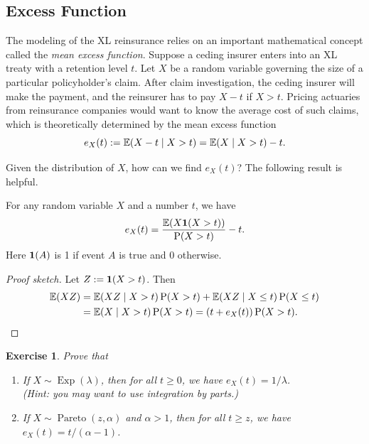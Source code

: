 \documentclass[12pt]{article}
\DeclareMathOperator{\Exp}{Exp}
\DeclareMathOperator{\Pareto}{Pareto}
\newtheorem{exercise}{Exercise}[section]
\begin{document}
\subsection{Excess Function}

The modeling of the XL reinsurance relies on an important mathematical concept
called the \emph{mean excess function}.
Suppose a ceding insurer enters into an XL treaty with a retention level $t$.
Let $X$ be a random variable governing the size of a particular policyholder's claim.
After claim investigation, the ceding insurer will make the payment,
and the reinsurer has to pay $X-t$ if $X > t$.
Pricing actuaries from reinsurance companies would want to know the average cost of such claims,
which is theoretically determined by the mean excess function
\begin{equation}
\label{eq:excess-defn}
e_X(t) := \operatorname*{\mathbb{E}}(X-t \mid X>t) = \operatorname*{\mathbb{E}}(X \mid X>t) - t.
\end{equation}

Given the distribution of $X$, how can we find $e_X(t)$?
The following result is helpful.

\begin{tcolorbox}[myres]
\begin{theorem}
\label{thm:excess-alt}
For any random variable $X$ and a number $t$, we have
\[ e_X(t) = \frac{\operatorname*{\mathbb{E}}(X\mathbf{1}(X > t))}{\operatorname{\mathrm{P}}(X > t)} - t. \]
Here $\mathbf{1}(A)$ is 1 if event $A$ is true and 0 otherwise.
\end{theorem}
\end{tcolorbox}
\begin{proof}[Proof sketch]
Let $Z := \mathbf{1}(X > t)$. Then
\begin{align*}
\operatorname*{\mathbb{E}}(XZ) &= \operatorname*{\mathbb{E}}(XZ \mid X > t)\operatorname{\mathrm{P}}(X > t) + \operatorname*{\mathbb{E}}(XZ \mid X \le t)\operatorname{\mathrm{P}}(X \le t)
\\ &= \operatorname*{\mathbb{E}}(X \mid X > t)\operatorname{\mathrm{P}}(X > t) = (t + e_X(t))\operatorname{\mathrm{P}}(X > t).
\qedhere \end{align*}
\end{proof}

\begin{tcolorbox}[mathExe]
\begin{exercise}
\label{exe:excess}
Prove that
\begin{enumerate}[label=(\alph*)]
\item If $X \sim \Exp(\lambda)$, then for all $t \ge 0$, we have $e_X(t) = 1/\lambda$.
    \\ \textcolor{mathExeSec}{(Hint: you may want to use \emph{integration by parts}.)}
\item If $X \sim \Pareto(z, \alpha)$ and $\alpha > 1$,
    then for all $t \ge z$, we have $e_X(t) = t/(\alpha-1)$.
\end{enumerate}
\end{exercise}
\end{tcolorbox}
\end{document}
